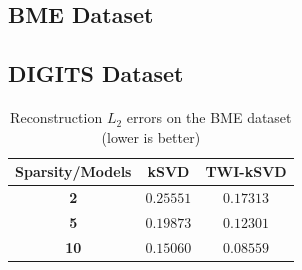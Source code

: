 \documentclass[11pt]{article}
\begin{document}
\subsection{BME Dataset}

\paragraph{} 

\subsection{DIGITS Dataset}

\paragraph{} 


\begin{table}[!ht]
    \centering
        \begin{tabular}{ccc}
            \toprule
            \textbf{Sparsity/Models} & \textbf{kSVD} & \textbf{TWI-kSVD} \\
            \midrule
            \textbf{2} & $0.25551$ & $0.17313$ \\
            \textbf{5} & $0.19873$ & $0.12301$ \\
            \textbf{10} & $\bm{0.15060}$ & $\bm{0.08559}$ \\
            \bottomrule
        \end{tabular}
    \caption{Reconstruction $L_2$ errors on the BME dataset (lower is better)}
    \label{tab:reconstruction_results_BME}
\end{table}
\end{document}
